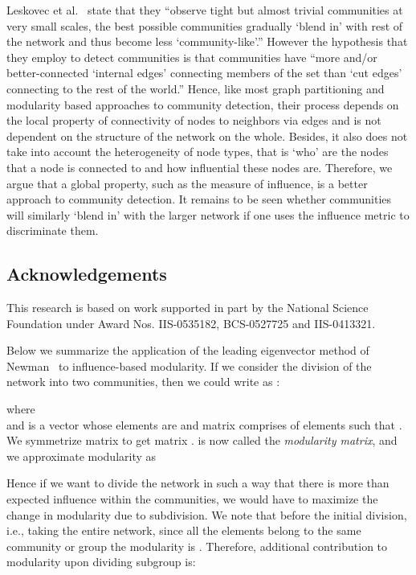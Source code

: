 \documentclass{sig-alternate}
\begin{document}
Leskovec et al.~\cite{Leskovec08www} state that they ``observe tight but almost trivial communities at very small scales, the best possible communities gradually `blend in'  with rest of the network  and thus become less `community-like'.'' However the hypothesis that they employ to detect communities  is that communities have ``more and/or better-connected `internal edges' connecting members of the set than `cut edges' connecting to the rest of the world.'' Hence, like most graph partitioning and modularity based approaches to community detection, their process depends on the local property of connectivity of nodes to neighbors via edges and is not dependent on the structure of the network on the whole. Besides, it also  does not take into account the heterogeneity of node types, that is `who' are the nodes that a node is connected to and how influential these nodes are. Therefore, we argue that a global property, such as the measure of influence, is a better approach to community detection. It remains to be seen whether communities will similarly `blend in' with the larger network if one uses the influence metric to discriminate them. 




\subsection*{Acknowledgements}
This research is based on work supported
in part by the National Science Foundation under Award Nos.
IIS-0535182, BCS-0527725 and IIS-0413321. 







\appendix{}
Below we summarize the application of the leading eigenvector method of Newman~\cite{Newman206} to influence-based modularity. If we consider the division of the network into two communities, then we could write  as :
 
where \\

and  is a vector whose elements are  and matrix  comprises of elements  such that
.
We symmetrize matrix  to get matrix .  is now called the \emph {modularity matrix}, and we approximate modularity as


Hence if we want to divide the network in such a way that there is more than expected influence within the communities, we would have to maximize the change in modularity due to  subdivision. We note that before the initial division, i.e., taking the entire network,  since  all the elements belong to the same community or group the modularity is .
Therefore, additional contribution  to modularity upon dividing subgroup   is:
\end{document}
